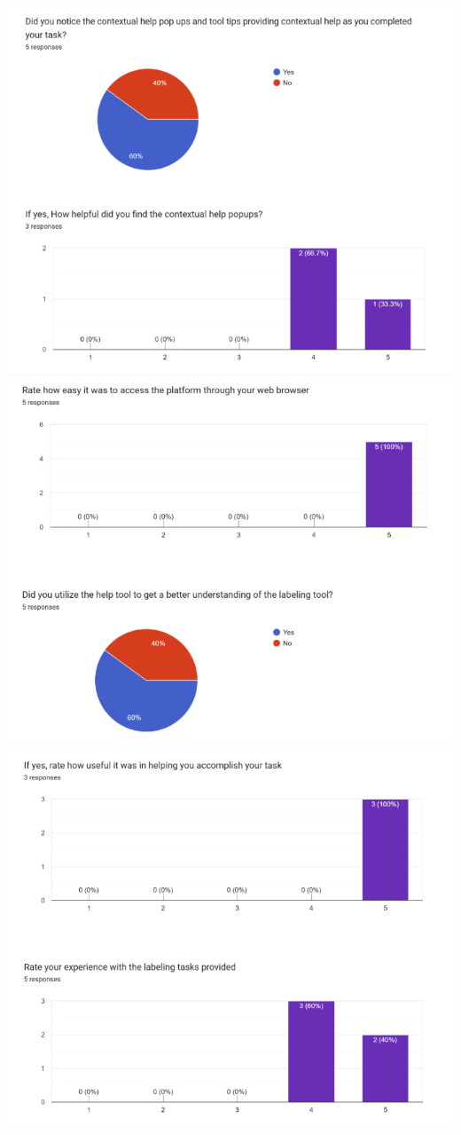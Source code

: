 \documentclass[12pt, titlepage]{article}
\begin{document}
\begin{centering}
\includegraphics[scale=0.7]{chart_2_3.png}\\
\includegraphics[scale=0.7]{chart_2_4.png}\\
\includegraphics[scale=0.7]{chart_2_5.png}\\

\end{centering}
\end{document}
